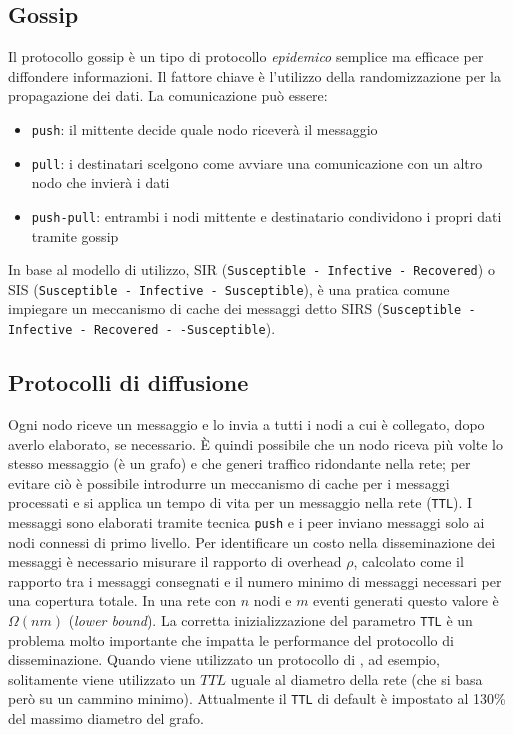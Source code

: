 \begin{appendices}
    \chapter{Gossip}
    Il protocollo gossip è un tipo di protocollo \textit{epidemico} semplice ma efficace per diffondere informazioni. Il fattore chiave è l'utilizzo della randomizzazione per la propagazione dei dati.\newline
    La comunicazione può essere:
    \begin{itemize}
        \item \texttt{push}: il mittente decide quale nodo riceverà il messaggio
        \item \texttt{pull}: i destinatari scelgono come avviare una comunicazione con un altro nodo che invierà i dati
        \item \texttt{push-pull}: entrambi i nodi mittente e destinatario condividono i propri dati tramite gossip
    \end{itemize}
    In base al modello di utilizzo, SIR (\texttt{Susceptible - Infective - Recovered}) o SIS (\texttt{Susceptible - Infective - Susceptible}), è una pratica comune impiegare un meccanismo di cache dei messaggi detto SIRS (\texttt{Susceptible - Infective - Recovered - -Susceptible}).
    
    \section{Protocolli di diffusione}
    Ogni nodo riceve un messaggio e lo invia a tutti i nodi a cui è collegato, dopo averlo elaborato, se necessario. È quindi possibile che un nodo riceva più volte lo stesso messaggio (è un grafo) e che generi traffico ridondante nella rete; per evitare ciò è possibile introdurre un meccanismo di cache per i messaggi processati e si applica un tempo di vita per un messaggio nella rete (\texttt{TTL}).\newline
    I messaggi sono elaborati tramite tecnica \texttt{push} e i peer inviano messaggi solo ai nodi connessi di primo livello.\newline
    Per identificare un costo nella disseminazione dei messaggi è necessario misurare il rapporto di overhead $\rho$, calcolato come il rapporto tra i messaggi consegnati e il numero minimo di messaggi necessari per una copertura totale. In una rete con $n$ nodi e $m$ eventi generati questo valore è $\Omega(nm)$ (\textit{lower bound}).\newline
    La corretta inizializzazione del parametro \texttt{TTL} è un problema molto importante che impatta le performance del protocollo di disseminazione. Quando viene utilizzato un protocollo di , ad esempio, solitamente viene utilizzato un $TTL$ uguale al diametro della rete (che si basa però su un cammino minimo). Attualmente il \texttt{TTL} di default è impostato al 130\% del massimo diametro del grafo.
    

\end{appendices}
